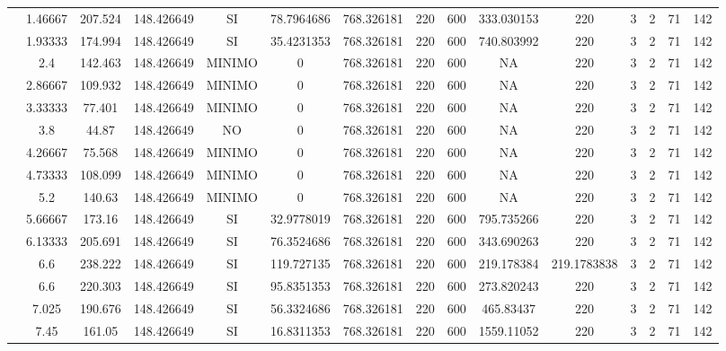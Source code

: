 \begin{table}[H]
{\begin{tabular}{|c|c|c|c|c|c|c|c|c|c|c|c|c|c|c|}
\cline{2-15}    & 1.46667 & 207.524 & 148.426649 & SI  & 78.7964686 & 768.326181 & 220 & 600 & 333.030153 & 220 & 3   & 2   & 71  & 142 \bigstrut\\
\cline{2-15}    & 1.93333 & 174.994 & 148.426649 & SI  & 35.4231353 & 768.326181 & 220 & 600 & 740.803992 & 220 & 3   & 2   & 71  & 142 \bigstrut\\
\cline{2-15}    & 2.4 & 142.463 & 148.426649 & MINIMO & 0   & 768.326181 & 220 & 600 & NA  & 220 & 3   & 2   & 71  & 142 \bigstrut\\
\cline{2-15}    & 2.86667 & 109.932 & 148.426649 & MINIMO & 0   & 768.326181 & 220 & 600 & NA  & 220 & 3   & 2   & 71  & 142 \bigstrut\\
\cline{2-15}    & 3.33333 & 77.401 & 148.426649 & MINIMO & 0   & 768.326181 & 220 & 600 & NA  & 220 & 3   & 2   & 71  & 142 \bigstrut\\
\cline{2-15}    & 3.8 & 44.87 & 148.426649 & NO  & 0   & 768.326181 & 220 & 600 & NA  & 220 & 3   & 2   & 71  & 142 \bigstrut\\
\cline{2-15}    & 4.26667 & 75.568 & 148.426649 & MINIMO & 0   & 768.326181 & 220 & 600 & NA  & 220 & 3   & 2   & 71  & 142 \bigstrut\\
\cline{2-15}    & 4.73333 & 108.099 & 148.426649 & MINIMO & 0   & 768.326181 & 220 & 600 & NA  & 220 & 3   & 2   & 71  & 142 \bigstrut\\
\cline{2-15}    & 5.2 & 140.63 & 148.426649 & MINIMO & 0   & 768.326181 & 220 & 600 & NA  & 220 & 3   & 2   & 71  & 142 \bigstrut\\
\cline{2-15}    & 5.66667 & 173.16 & 148.426649 & SI  & 32.9778019 & 768.326181 & 220 & 600 & 795.735266 & 220 & 3   & 2   & 71  & 142 \bigstrut\\
\cline{2-15}    & 6.13333 & 205.691 & 148.426649 & SI  & 76.3524686 & 768.326181 & 220 & 600 & 343.690263 & 220 & 3   & 2   & 71  & 142 \bigstrut\\
\cline{2-15}    & 6.6 & 238.222 & 148.426649 & SI  & 119.727135 & 768.326181 & 220 & 600 & 219.178384 & 219.1783838 & 3   & 2   & 71  & 142 \bigstrut\\
\cline{2-15}    & 6.6 & 220.303 & 148.426649 & SI  & 95.8351353 & 768.326181 & 220 & 600 & 273.820243 & 220 & 3   & 2   & 71  & 142 \bigstrut\\
\cline{2-15}    & 7.025 & 190.676 & 148.426649 & SI  & 56.3324686 & 768.326181 & 220 & 600 & 465.83437 & 220 & 3   & 2   & 71  & 142 \bigstrut\\
\cline{2-15}    & 7.45 & 161.05 & 148.426649 & SI  & 16.8311353 & 768.326181 & 220 & 600 & 1559.11052 & 220 & 3   & 2   & 71  & 142 \bigstrut\\

\end{tabular}}
\end{table}
